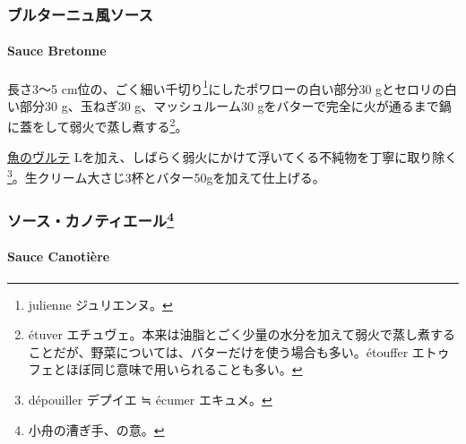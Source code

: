 \begin{recette}
{\subsubsection{ブルターニュ風ソース}\label{ux30d6ux30ebux30bfux30fcux30cbux30e5ux98a8ux30bdux30fcux30b9}}

\hypertarget{sauce-bretonne-blanche}{%
\paragraph{Sauce Bretonne}\label{sauce-bretonne-blanche}}


長さ3〜5 cm位の、ごく細い千切り\footnote{julienne ジュリエンヌ。}にしたポワローの白い部分30
gとセロリの白い部分30 g、玉ねぎ30 g、マッシュルーム30
gをバターで完全に火が通るまで鍋に蓋をして弱火で蒸し煮する\footnote{étuver
  エチュヴェ。本来は油脂とごく少量の水分を加えて弱火で蒸し煮することだが、野菜については、バターだけを使う場合も多い。étouffer
  エトゥフェとほぼ同じ意味で用いられることも多い。}。

\protect\hyperlink{veloute-de-poisson}{魚のヴルテ}\troisquarts{}
Lを加え、しばらく弱火にかけて浮いてくる不純物を丁寧に取り除く\footnote{dépouiller
  デプイエ ≒ écumer エキュメ。}。生クリーム大さじ3杯とバター50gを加えて仕上げる。

\maeaki

\hypertarget{ux30bdux30fcux30b9ux30abux30ceux30c6ux30a3ux30a8ux30fcux30eb20}{%
\subsubsection[ソース・カノティエール]{\texorpdfstring{ソース・カノティエール\footnote{小舟の漕ぎ手、の意。}}{ソース・カノティエール}}\label{ux30bdux30fcux30b9ux30abux30ceux30c6ux30a3ux30a8ux30fcux30eb20}}

\hypertarget{sauce-canotiere}{%
\paragraph{Sauce Canotière}\label{sauce-canotiere}}



\end{recette}
